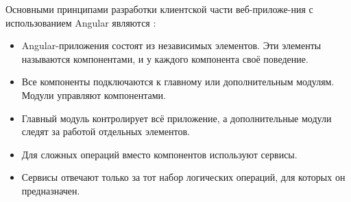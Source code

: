 Основными принципами разработки клиентской части веб-приложе-ния с использованием Angular являются \cite{freeman_ProAngular}:
\begin{itemize}
	\item Angular-приложения состоят из независимых элементов. Эти элементы называются компонентами, и у каждого компонента своё поведение.
	\item Все компоненты подключаются к главному или дополнительным модулям. Модули управляют компонентами.
	\item Главный модуль контролирует всё приложение, а дополнительные модули следят за работой отдельных элементов.
	\item Для сложных операций вместо компонентов используют сервисы.
	\item Сервисы отвечают только за тот набор логических операций, для которых он предназначен.
\end{itemize}


